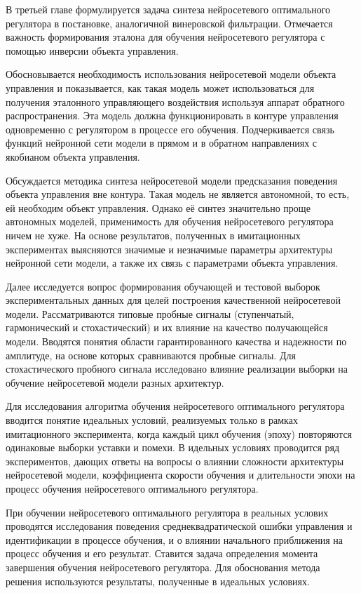 
В третьей главе формулируется задача синтеза нейросетевого
оптимального регулятора в постановке, аналогичной винеровской
фильтрации.  Отмечается важность формирования эталона для обучения
нейросетевого регулятора с помощью инверсии объекта управления.

Обосновывается необходимость использования нейросетевой модели объекта
управления и показывается, как такая модель может использоваться для
получения эталонного управляющего воздействия используя аппарат
обратного распространения.  Эта модель должна функционировать в
контуре управления одновременно с регулятором в процессе его обучения.
Подчеркивается связь функций нейронной сети модели в прямом и в
обратном направлениях с якобианом объекта управления.

Обсуждается методика синтеза нейросетевой модели предсказания
поведения объекта управления вне контура.  Такая модель не является
автономной, то есть, ей необходим объект управления.  Однако её синтез
значительно проще автономных моделей, применимость для обучения
нейросетевого регулятора ничем не хуже.  На основе результатов,
полученных в имитационных экспериментах выясняются значимые и
незначимые параметры архитектуры нейронной сети модели, а также их
связь с параметрами объекта управления.

Далее исследуется вопрос формирования обучающей и тестовой выборок
экспериментальных данных для целей построения качественной
нейросетевой модели.  Рассматриваются типовые пробные сигналы
(ступенчатый, гармонический и стохастический) и их влияние на качество
получающейся модели.  Вводятся понятия области гарантированного
качества и надежности по амплитуде, на основе которых сравниваются
пробные сигналы.  Для стохастического пробного сигнала исследовано
влияние реализации выборки на обучение нейросетевой модели разных
архитектур.

Для исследования алгоритма обучения нейросетевого оптимального
регулятора вводится понятие идеальных условий, реализуемых только в
рамках имитационного эксперимента, когда каждый цикл обучения (эпоху)
повторяются одинаковые выборки уставки и помехи.  В идельных условиях
проводится ряд экспериментов, дающих ответы на вопросы о влиянии
сложности архитектуры нейросетевой модели, коэффициента скорости
обучения и длительности эпохи на процесс обучения нейросетевого
оптимального регулятора.

При обучении нейросетевого оптимального регулятора в реальных услових
проводятся исследования поведения среднеквадратической ошибки
управления и идентификации в процессе обучения, и о влиянии начального
приближения на процесс обучения и его результат.  Ставится задача
определения момента завершения обучения нейросетевого регулятора.  Для
обоснования метода решения используются результаты, полученные в
идеальных условиях.

